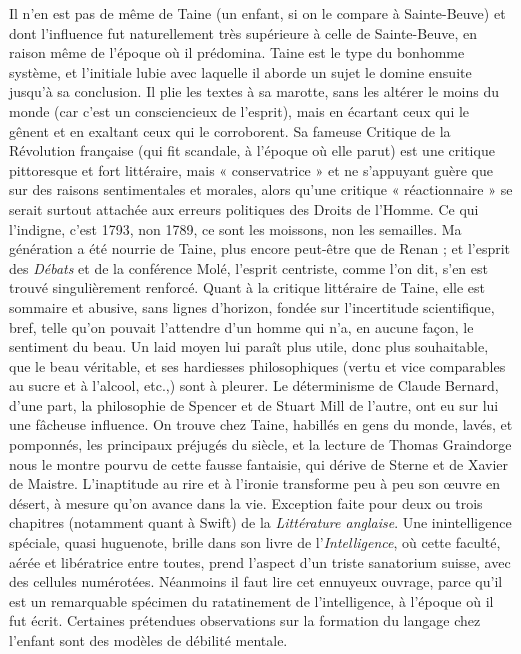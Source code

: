 \documentclass[french,twoside]{book} %
\begin{document}
Il n’en est pas de même de Taine (un enfant, si on le compare à Sainte-Beuve) et dont l’influence fut naturellement très supérieure à celle de Sainte-Beuve, en raison même de l’époque où il prédomina. Taine est le type du bonhomme système, et l’initiale lubie avec laquelle il aborde un sujet le domine ensuite jusqu’à sa conclusion. Il plie les textes à sa marotte, sans les altérer le moins du monde (car c’est un consciencieux de l’esprit), mais en écartant ceux qui le gênent et en exaltant ceux qui le corroborent. Sa fameuse Critique de la Révolution française (qui fit scandale, à l’époque où elle parut) est une critique pittoresque et fort littéraire, mais « conservatrice » et ne s’appuyant guère que sur des raisons sentimentales et morales, alors qu’une critique « réactionnaire » se serait surtout attachée aux erreurs politiques des Droits de l’Homme. Ce qui l’indigne, c’est 1793, non 1789, ce sont les moissons, non les semailles. Ma génération a été nourrie de Taine, plus encore peut-être que de Renan ; et l’esprit des {\itshape Débats} et de la conférence Molé, l’esprit centriste, comme l’on dit, s’en est trouvé singulièrement renforcé. Quant à la critique littéraire de Taine, elle est sommaire et abusive, sans lignes d’horizon, fondée sur l’incertitude scientifique, bref, telle qu’on pouvait l’attendre d’un homme qui n’a, en aucune façon, le sentiment du beau. Un laid moyen lui paraît plus utile, donc plus souhaitable, que le beau véritable, et ses hardiesses philosophiques (vertu et vice comparables au sucre et à l’alcool, etc.,) sont à pleurer. Le déterminisme de Claude Bernard, d’une part, la philosophie de Spencer et de Stuart Mill de l’autre, ont eu sur lui une fâcheuse influence. On trouve chez Taine, habillés en gens du monde, lavés, et pomponnés, les principaux préjugés du siècle, et la lecture de Thomas Graindorge nous le montre pourvu de cette fausse fantaisie, qui dérive de Sterne et de Xavier de Maistre. L’inaptitude au rire et à l’ironie transforme peu à peu son œuvre en désert, à mesure qu’on avance dans la vie. Exception faite pour deux ou trois chapitres (notamment quant à Swift) de la {\itshape Littérature anglaise}. Une inintelligence spéciale, quasi huguenote, brille dans son livre de l’{\itshape Intelligence}, où cette faculté, aérée et libératrice entre toutes, prend l’aspect d’un triste sanatorium suisse, avec des cellules numérotées. Néanmoins il faut lire cet ennuyeux ouvrage, parce qu’il est un remarquable spécimen du ratatinement de l’intelligence, à l’époque où il fut écrit. Certaines prétendues observations sur la formation du langage chez l’enfant sont des modèles de débilité mentale.\par
\end{document}
